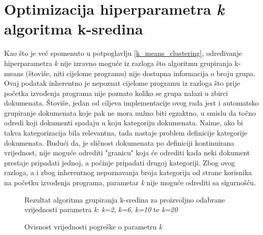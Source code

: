 \documentclass[times, utf8, zavrsni]{fer}
\begin{document}
\section{Optimizacija hiperparametra \textit{k} algoritma k-sredina}
\label{kmeans_optimization}
Kao što je već spomenuto u potpoglavlju \ref{k_means_clustering}, određivanje hiperparametra \textit{k} nije izravno moguće iz razloga što algoritmu grupiranja k-means (štoviše, niti cijelome programu) nije dostupna informacija o broju grupa. Ovaj podatak inherentno je nepoznat cijelome programu iz razloga što prije početka izvođenja programa nije poznato koliko se grupa nalazi u zbirci dokumenata. Štoviše, jedan od ciljeva implementacije ovog rada jest i automatsko grupiranje dokumenata koje pak ne mora nužno biti egzaktno, u smislu da točno odredi koji dokumenti spadaju u koju kategoriju dokumenata. Naime, ako bi takva kategorizacija bila relevantna, tada nastaje problem definicije kategorije dokumenata. Budući da, je sličnost dokumenata po definiciji kontinuirana vrijednost, nije moguće odrediti "granicu" koja će odrediti kada neki dokument prestaje pripadati jednoj, a počinje pripadati drugoj kategoriji. Zbog ovog razloga, a i zbog inherentnog nepoznavanja broja kategorija od strane korisnika na početku izvođenja programa, parametar \textit{k} nije moguće odrediti sa sigurnošću.
\begin{figure}
\caption{Rezultat algoritma grupiranja k-sredina za proizvoljno odabrane vrijednosti parametra \textit{k}: \textit{k=2}, \textit{k=6}, \textit{k=10} te \textit{k=20}}
\label{img:graph_kmeans}
\end{figure}
\begin{figure}[h]
\centering    
\def\svgwidth{\columnwidth}

\caption{Ovisnost vrijednosti pogreške o parametru \textit{k}}
\label{img:elbow}
\end{figure}
\end{document}
